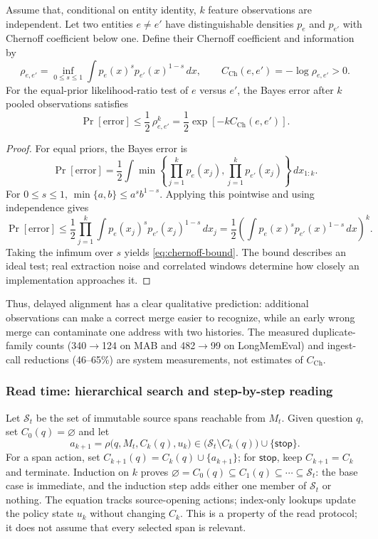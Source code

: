 \begin{proposition}
\label{prop:convergence}
Assume that, conditional on entity identity, $k$ feature observations are independent. Let two entities $e\ne e'$ have distinguishable densities $p_e$ and $p_{e'}$ with Chernoff coefficient below one. Define their Chernoff coefficient and information by
\[
\rho_{e,e'}=\inf_{0\le s\le 1}
\int p_e(x)^s p_{e'}(x)^{1-s}\,dx,
\qquad
C_{\mathrm{Ch}}(e,e')=-\log\rho_{e,e'}>0.
\]
For the equal-prior likelihood-ratio test of $e$ versus $e'$, the Bayes error after $k$ pooled observations satisfies \citep{chernoff1952measure}
\begin{equation}
\Pr[\mathrm{error}]
\le \frac12\,\rho_{e,e'}^k
=\frac12\exp\!\left[-kC_{\mathrm{Ch}}(e,e')\right].
\label{eq:chernoff-bound}
\end{equation}
\end{proposition}

\begin{proof}
For equal priors, the Bayes error is
\[
\Pr[\mathrm{error}]
=\frac12\int \min\!\left\{\prod_{j=1}^{k}p_e(x_j),
\prod_{j=1}^{k}p_{e'}(x_j)\right\}\,d x_{1:k}.
\]
For $0\le s\le1$, $\min\{a,b\}\le a^s b^{1-s}$. Applying this pointwise and using independence gives
\[
\Pr[\mathrm{error}]
\le \frac12\prod_{j=1}^{k}
\int p_e(x_j)^s p_{e'}(x_j)^{1-s}\,dx_j
=\frac12\left(\int p_e(x)^s p_{e'}(x)^{1-s}\,dx\right)^k.
\]
Taking the infimum over $s$ yields \cref{eq:chernoff-bound}. The bound describes an ideal test; real extraction noise and correlated windows determine how closely an implementation approaches it.
\end{proof}

Thus, delayed alignment has a clear qualitative prediction: additional observations can make a correct merge easier to recognize, while an early wrong merge can contaminate one address with two histories. The measured duplicate-family counts (340$\to$124 on MAB and 482$\to$99 on LongMemEval) and ingest-call reductions (46--65\%) are system measurements, not estimates of $C_{\mathrm{Ch}}$.

\subsubsection{Read time: hierarchical search and step-by-step reading}

Let $\mathcal S_t$ be the set of immutable source spans reachable from $M_t$. Given question $q$, set $C_0(q)=\varnothing$ and let
\[
a_{k+1}=\rho\bigl(q,M_t,C_k(q),u_k\bigr)
\in\bigl(\mathcal S_t\setminus C_k(q)\bigr)\cup\{\mathsf{stop}\}.
\]
For a span action, set $C_{k+1}(q)=C_k(q)\cup\{a_{k+1}\}$; for $\mathsf{stop}$, keep $C_{k+1}=C_k$ and terminate. Induction on $k$ proves $\varnothing=C_0(q)\subseteq C_1(q)\subseteq\cdots\subseteq\mathcal S_t$: the base case is immediate, and the induction step adds either one member of $\mathcal S_t$ or nothing. The equation tracks source-opening actions; index-only lookups update the policy state $u_k$ without changing $C_k$. This is a property of the read protocol; it does not assume that every selected span is relevant.

